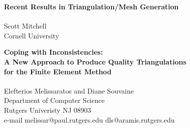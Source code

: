 \vfill

\begin{center}
{\large\bf 
Recent Results in Triangulation/Mesh Generation}\\
\quad\\
Scott Mitchell\\
Cornell University
\end{center}

\begin{abstract}
A guaranteed quality steiner
triangulation of a three dimensional polygonal region
is of interest for finite element analysis.
Recent work on maximum altitude triangulations
in two dimensions has made possible an octree based
algorithm for generating a guaranteed aspect ratio
triangulation in three dimensions.  I will demonstrate
a program that generates a guaranteed aspect ratio
triangulation in two dimensions, and discuss how
it may be extended to three dimensions.

\end{abstract}

\vfill
\newpage

\begin{center}
{\large\bf 
Coping with Inconsistencies:\\ 
A New Approach to Produce Quality Triangulations\\ 
for the Finite Element Method}\\
\quad\\
Elefterios Melissaratos and Diane Souvaine\\
Department of Computer Science\\
Rutgers Univeristy NJ 08903\\
e-mail  melissar@paul.rutgers.edu  dls@aramis.rutgers.edu
\end{center}

